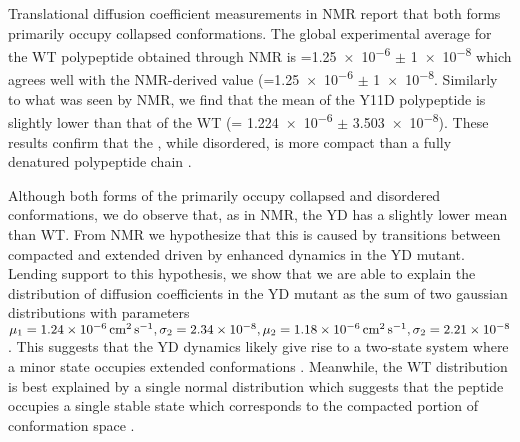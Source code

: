 Translational diffusion coefficient measurements in NMR report that both \gct forms primarily occupy collapsed conformations. The global experimental average for the WT polypeptide obtained through NMR is \diffusion=\num{1.25e-6} $\pm$  \SI{1e-8}{\dcunits} which agrees well with the NMR-derived value (\diffusion=\num{1.25e-6} $\pm$  \SI{1e-8}{\dcunits}. Similarly to what was seen by NMR, we find that the mean \diffusion of the Y11D \gct polypeptide is slightly lower than that of the WT \gct (\diffusion= \num{1.224e-6} $\pm$ \SI{3.503e-8}{\dcunits}). These results confirm that the \gct, while disordered, is more compact than a fully denatured polypeptide chain . 

Although both forms of the \gct primarily occupy collapsed and disordered conformations, we do observe that, as in NMR, the YD \gct has a slightly lower mean \diffusion than WT. From NMR we hypothesize that this is caused by transitions between compacted and extended driven by enhanced dynamics in the YD mutant. Lending support to this hypothesis, we show that we are able to explain the distribution of diffusion coefficients in the YD mutant as the sum of two gaussian distributions with parameters $\mu_1 =\SI{1.24e-6}{\dcunits}, \sigma_2= \num{2.34e-8}, \mu_2 =\SI{1.18e-6}{\dcunits}, \sigma_2= \num{2.21e-8}$ . This suggests that the YD dynamics likely give rise to a two-state system where a minor state occupies extended conformations . Meanwhile, the WT \diffusion distribution is best explained by a single normal distribution which suggests that the peptide occupies a single stable state which corresponds to the compacted portion of conformation space .





